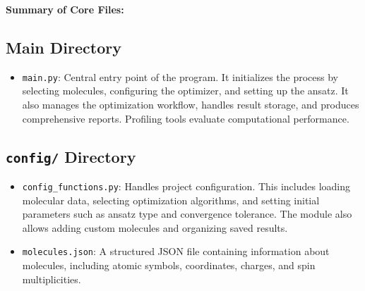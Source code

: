 \vspace{1em}
\noindent\textbf{Summary of Core Files:}

\subsection{Main Directory}
\begin{itemize}
    \item \texttt{main.py}:
    Central entry point of the program. It initializes the process by selecting molecules, configuring the optimizer, and setting up the ansatz. It also manages the optimization workflow, handles result storage, and produces comprehensive reports. Profiling tools evaluate computational performance.
\end{itemize}

\subsection{\texttt{config/} Directory}
\begin{itemize}
    \item \texttt{config\_functions.py}:
    Handles project configuration. This includes loading molecular data, selecting optimization algorithms, and setting initial parameters such as ansatz type and convergence tolerance. The module also allows adding custom molecules and organizing saved results.
    \item \texttt{molecules.json}:
    A structured JSON file containing information about molecules, including atomic symbols, coordinates, charges, and spin multiplicities.
\end{itemize}

